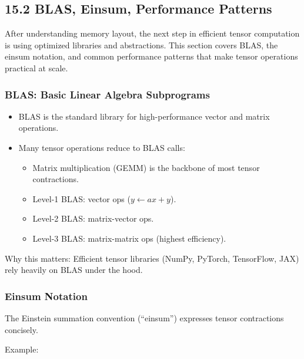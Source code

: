 \documentclass[
  letterpaper,
  DIV=11,
  numbers=noendperiod]{scrreprt}
\providecommand{\tightlist}{%
  \setlength{\itemsep}{0pt}\setlength{\parskip}{0pt}}
\begin{document}
\subsection{15.2 BLAS, Einsum, Performance
Patterns}\label{blas-einsum-performance-patterns}

After understanding memory layout, the next step in efficient tensor
computation is using optimized libraries and abstractions. This section
covers BLAS, the einsum notation, and common performance patterns that
make tensor operations practical at scale.

\subsubsection{BLAS: Basic Linear Algebra
Subprograms}\label{blas-basic-linear-algebra-subprograms}

\begin{itemize}
\item
  BLAS is the standard library for high-performance vector and matrix
  operations.
\item
  Many tensor operations reduce to BLAS calls:

  \begin{itemize}
  \tightlist
  \item
    Matrix multiplication (GEMM) is the backbone of most tensor
    contractions.
  \item
    Level-1 BLAS: vector ops (\(y \leftarrow ax + y\)).
  \item
    Level-2 BLAS: matrix-vector ops.
  \item
    Level-3 BLAS: matrix-matrix ops (highest efficiency).
  \end{itemize}
\end{itemize}

Why this matters: Efficient tensor libraries (NumPy, PyTorch,
TensorFlow, JAX) rely heavily on BLAS under the hood.

\subsubsection{Einsum Notation}\label{einsum-notation}

The Einstein summation convention (``einsum'') expresses tensor
contractions concisely.

Example:
\end{document}
